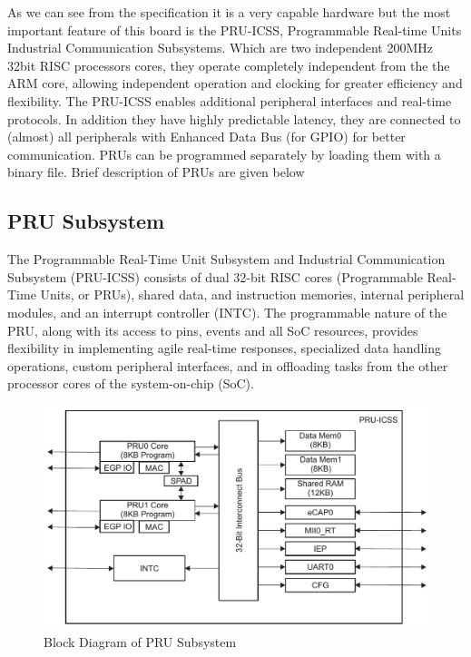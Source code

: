 As we can see from the specification it is a very capable hardware but the most important feature of this board is the PRU-ICSS, Programmable Real-time Units Industrial Communication Subsystems. Which are two independent 200MHz 32bit RISC processors cores, they operate completely independent from the the ARM core,  allowing independent operation and clocking for greater efficiency and flexibility. The PRU-ICSS enables additional peripheral interfaces and real-time protocols. In addition they have highly predictable latency, they are connected to (almost) all peripherals with Enhanced Data Bus (for GPIO) for better communication. PRUs can be programmed separately by loading them with a binary file. Brief description of PRUs are given below

\subsection{PRU Subsystem}
The Programmable Real-Time Unit Subsystem and Industrial Communication Subsystem (PRU-ICSS) consists of dual 32-bit RISC cores (Programmable Real-Time Units, or PRUs), shared data, and instruction memories, internal peripheral modules, and an interrupt controller (INTC). The programmable nature of the PRU, along with its access to pins, events and all SoC resources, provides flexibility in implementing agile real-time responses, specialized data handling operations, custom peripheral interfaces, and in offloading tasks from the other processor cores of the system-on-chip (SoC).

\begin{figure}
	\includegraphics[width=\textwidth]{fig/PRUIcss.png}
	\caption{Block Diagram of PRU Subsystem}
	\label{fig:prublkdrg}
\end{figure}

